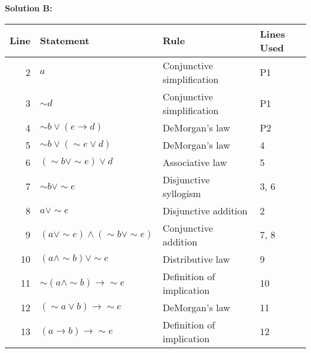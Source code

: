 \documentclass[10pt, letterpaper]{article}
\newcommand{\nott}{{\sim}}
\begin{document}
\begin{enumerate}
\textbf{Solution B:}

\begin{tabular}{|r|l|l|l|} \hline
Line & Statement & Rule & Lines Used \\ \hline
2 & $a$ & Conjunctive simplification & P1\\ \hline
3 & $\nott d$ & Conjunctive simplification & P1\\ \hline
4 & $\nott b \lor (e \to d)$ & DeMorgan's law & P2\\ \hline
5 & $\nott b \lor (\nott e \lor d)$ & DeMorgan's law & 4\\ \hline
6 & $(\nott b \lor \nott e) \lor d$ & Associative law & 5\\ \hline
7 & $\nott b \lor \nott e $ & Disjunctive syllogism & 3, 6\\ \hline
8 & $a \lor \nott e $ & Disjunctive addition & 2\\ \hline
9 & $(a \lor \nott e) \land (\nott b \lor \nott e) $ & Conjunctive addition & 7, 8\\ \hline
10& $(a \land \nott b) \lor \nott e$ & Distributive law & 9 \\ \hline
11& $\nott (a \land \nott b) \to \nott e$ & Definition of implication & 10 \\ \hline
12& $(\nott a \lor b) \to \nott e$ & DeMorgan's law& 11 \\ \hline
13& $(a \to b) \to \nott e$ & Definition of implication& 12 \\ \hline
\end{tabular}

\end{enumerate}
                
\end{document}
